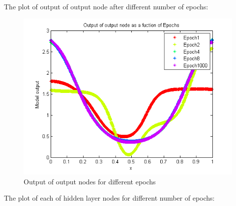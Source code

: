 \documentclass{article}
\begin{document}
The plot of output of output node after different number of epochs:

\begin{figure}[H]
\centering
\includegraphics[width=0.6\linewidth]{Regression/univariate/epoch_output.png}
\caption{Output of output nodes for different epochs}
\end{figure}

The plot of each of hidden layer nodes for different number of epochs:
\end{document}
